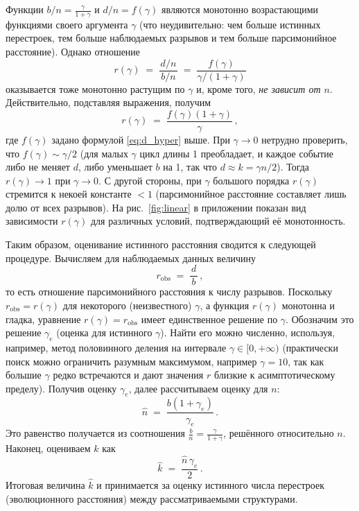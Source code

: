 Функции $b/n = \frac{\gamma}{1+\gamma}$ и $d/n = f(\gamma)$ являются монотонно возрастающими функциями своего аргумента $\gamma$ (что неудивительно: чем больше истинных перестроек, тем больше наблюдаемых разрывов и тем больше парсимонийное расстояние). Однако отношение 
\[
r(\gamma) \;=\; \frac{d/n}{\,b/n\,} \;=\; \frac{f(\gamma)}{\gamma/(1+\gamma)} 
\] 
оказывается тоже монотонно растущим по $\gamma$ и, кроме того, \emph{не зависит от $n$}. Действительно, подставляя выражения, получим 
\[
r(\gamma) \;=\; \frac{f(\gamma)(1+\gamma)}{\gamma}\,,
\] 
где $f(\gamma)$ задано формулой \eqref{eq:d_hyper} выше. При $\gamma \to 0$ нетрудно проверить, что $f(\gamma) \sim \gamma/2$ (для малых $\gamma$ цикл длины 1 преобладает, и каждое событие либо не меняет $d$, либо уменьшает $b$ на 1, так что $d \approx k = \gamma n/2$). Тогда $r(\gamma) \to 1$ при $\gamma \to 0$. С другой стороны, при $\gamma$ большого порядка $r(\gamma)$ стремится к некоей константе $<1$ (парсимонийное расстояние составляет лишь долю от всех разрывов). На рис.~\ref{fig:linear} в приложении показан вид зависимости $r(\gamma)$ для различных условий, подтверждающий её монотонность.

Таким образом, оценивание истинного расстояния сводится к следующей процедуре. Вычисляем для наблюдаемых данных величину 
\[
r_{\text{obs}} \;=\; \frac{d}{\,b\,}\,,
\] 
то есть отношение парсимонийного расстояния к числу разрывов. Поскольку $r_{\text{obs}} = r(\gamma)$ для некоторого (неизвестного) $\gamma$, а функция $r(\gamma)$ монотонна и гладка, уравнение $r(\gamma) = r_{\text{obs}}$ имеет единственное решение по $\gamma$. Обозначим это решение $\gamma_e$ (оценка для истинного $\gamma$). Найти его можно численно, используя, например, метод половинного деления на интервале $\gamma \in [0, +\infty)$ (практически поиск можно ограничить разумным максимумом, например $\gamma=10$, так как большие $\gamma$ редко встречаются и дают значения $r$ близкие к асимптотическому пределу). Получив оценку $\gamma_e$, далее рассчитываем оценку для $n$:
\[
\hat{n} \;=\; \frac{b (1+\gamma_e)}{\gamma_e}\,. 
\] 
Это равенство получается из соотношения $\frac{b}{n} = \frac{\gamma}{1+\gamma}$, решённого относительно $n$. Наконец, оцениваем $k$ как 
\[
\hat{k} \;=\; \frac{\hat{n}\, \gamma_e}{2}\,.
\] 
Итоговая величина $\hat{k}$ и принимается за оценку истинного числа перестроек (эволюционного расстояния) между рассматриваемыми структурами.

